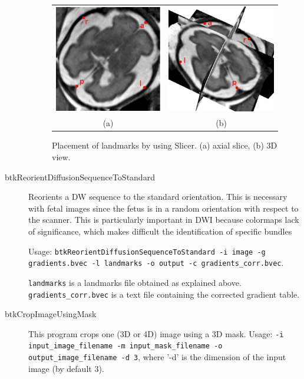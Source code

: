 \begin{description}
\begin{figure}[t]
\centering
\begin{tabular}{cc}
\includegraphics[width=0.35\columnwidth]{lmks_axial.eps}&
\includegraphics[width=0.35\columnwidth]{lmks_3D.eps}\\
{(a)}&{(b)}\\
\end{tabular}
\caption{Placement of landmarks by using Slicer. (a) axial slice, (b) 3D view.}
\label{fig:landmarks}
\end{figure}

  \item[btkReorientDiffusionSequenceToStandard] Reorients a DW sequence
to the standard orientation. This is necessary with fetal images since the fetus
is in a random orientation with respect to the scanner. This is particularly
important in DWI because colormaps lack of significance, which makes difficult
the identification of specific bundles 

Usage: \texttt{btkReorientDiffusionSequenceToStandard -i image -g
gradients.bvec -l landmarks -o output -c gradients\_corr.bvec}.

\texttt{landmarks} is a landmarks file obtained as explained above.
\texttt{gradients\_corr.bvec} is a text file containing the corrected
gradient table.

\item[btkCropImageUsingMask] This program crops one (3D or 4D) image using a 3D mask. Usage: \texttt{-i input\_image\_filename -m
input\_mask\_filename -o output\_image\_filename -d 3}, where '-d' is the dimension of the input image (by default 3).

\end{description}

